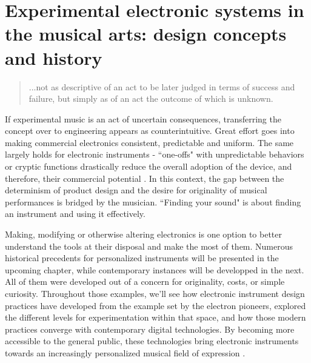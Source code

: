 \chapter{Experimental electronic systems in the musical arts: design concepts and history}\label{background}
\begin{quote}
	
	...not as descriptive of an act to be later judged in terms of success and failure, but simply as of an act the outcome of which is unknown. 
	
	\cite[p.13]{cage1961}
	
	\end{quote}
	
If experimental music is an act of uncertain consequences, transferring the concept over to engineering appears as counterintuitive. Great effort goes into making commercial electronics consistent, predictable and uniform. The same largely holds for electronic instruments - ``one-offs" with unpredictable behaviors or cryptic functions drastically reduce the overall adoption of the device, and therefore, their commercial potential \cite[p.5]{haslett2005}. In this context, the gap between the determinism of product design and the desire for originality of musical performances is bridged by the musician. ``Finding your sound" is about finding an instrument and using it effectively.  

Making, modifying or otherwise altering electronics is one option to better understand the tools at their disposal and make the most of them. Numerous historical precedents for personalized instruments will be presented in the upcoming chapter, while contemporary instances will be developped in the next. All of them were developed out of a concern for originality, costs, or simple curiosity. Throughout those examples, we'll see how electronic instrument design practices have developed from the example set by the electron pioneers, explored the different levels for experimentation within that space, and how those modern practices converge with contemporary digital technologies. By becoming more accessible to the general public, these technologies bring electronic instruments towards an increasingly personalized musical field of expression \cite{hermans2014}.

